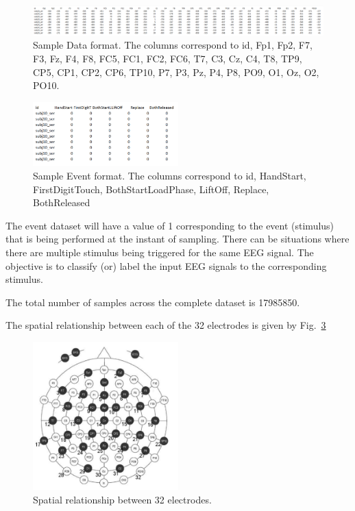 \documentclass[final,leqno,onefignum,onetabnum]{siamltexmm}
\begin{document}
\begin{figure}[ht!]
  \centering
  \includegraphics[width=1\textwidth]{images/sample_data}
  \caption{Sample Data format.  The columns correspond to id,  Fp1, Fp2, F7, F3, Fz, F4, F8, FC5, FC1, FC2, FC6, T7, C3, Cz, C4, T8, TP9, CP5, CP1, CP2, CP6, TP10, P7, P3, Pz, P4, P8, PO9, O1, Oz, O2, PO10.\label{fig:Sample_data}}
\end{figure}

\begin{figure}[ht!]
  \centering
  \includegraphics[width=0.5\textwidth]{images/sample_events}
  \caption{Sample Event format. The columns correspond to id, HandStart, FirstDigitTouch, BothStartLoadPhase, LiftOff, Replace, BothReleased\label{fig:sample_events}}
\end{figure}

The event dataset will have a value of 1 corresponding to the event (stimulus) that is being performed at the instant of sampling.  There can be situations where there are multiple stimulus being triggered for the same EEG signal.  The objective is to classify (or) label the input EEG signals to the corresponding stimulus.

The total number of samples across the complete dataset is 17985850.

The spatial relationship between each of the 32 electrodes is given by Fig.~\ref{fig:eeg_spatial_relation}

\begin{figure}
  \centering
  \includegraphics[width=0.5\textwidth]{images/eeg_spatial}
  \caption{Spatial relationship between 32 electrodes.\label{fig:eeg_spatial_relation}} 
\end{figure}
\end{document}
